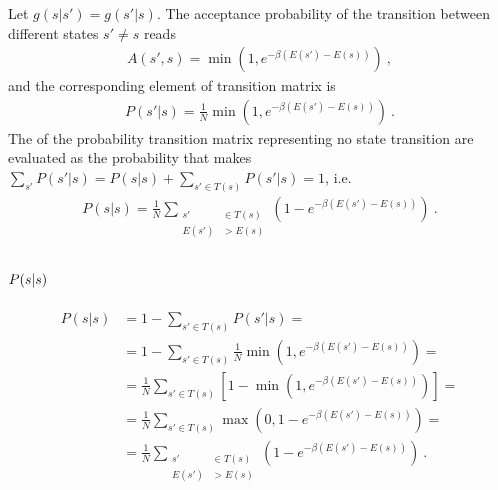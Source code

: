 \documentclass[letterpaper,10pt,english]{jupyterBook}
\begin{document}
\sphinxAtStartPar
Let \(g(s|s') = g(s'|s)\). The acceptance probability of the transition between different states \(s' \ne s\) reads
\begin{equation*}
\begin{split}A(s',s) = \min \left( 1, e^{ -\beta ( E(s') - E(s) )  } \right) \ ,\end{split}
\end{equation*}
\sphinxAtStartPar
and the corresponding element of transition matrix is
\begin{equation*}
\begin{split}P(s'|s) = \frac{1}{N} \min \left( 1, e^{ -\beta ( E(s') - E(s) )  } \right) \ .\end{split}
\end{equation*}
\sphinxAtStartPar
The  of the probability transition matrix \sphinxhyphen{} representing no state transition \sphinxhyphen{} are evaluated as the probability that makes \(\sum_{s'} P(s'|s) = P(s|s) + \sum_{s' \in T(s)} P(s'|s) = 1\), i.e.
\begin{equation*}
\begin{split}P(s|s) = \frac{1}{N} \sum_{\begin{aligned} s' & \in T(s) \\ E(s') & > E(s) \end{aligned}} \left( 1 - e^{-\beta (E(s') - E(s))} \right)  \ .\end{split}
\end{equation*}\subsubsection*{\protect\(P(s|s)\protect\)}
\begin{equation*}
\begin{split}\begin{aligned}
  P(s|s) 
  & = 1 - \sum_{s' \in T(s)} P(s'|s) = \\
  & = 1 - \sum_{s' \in T(s)} \frac{1}{N} \min \left( 1, e^{-\beta (E(s') - E(s))} \right) = \\
  & = \frac{1}{N} \sum_{s' \in T(s)} \left[ 1 - \min \left( 1, e^{-\beta (E(s') - E(s))} \right) \right] = \\
  & = \frac{1}{N} \sum_{s' \in T(s)} \max \left( 0, 1 - e^{-\beta (E(s') - E(s))} \right) = \\
  & = \frac{1}{N} \sum_{\begin{aligned} s' & \in T(s) \\ E(s') & > E(s) \end{aligned}} \left( 1 - e^{-\beta (E(s') - E(s))} \right)  \ .
\end{aligned}\end{split}
\end{equation*}
\end{document}
